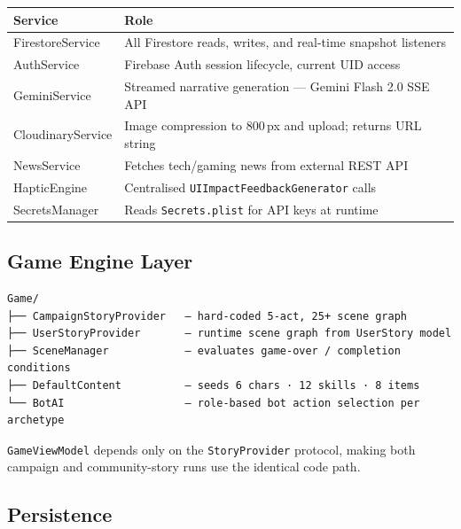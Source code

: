 \documentclass[12pt,a4paper]{article}
\begin{document}
\begin{center}
\begin{tabular}{>{\ttfamily\small}p{4cm} p{9.5cm}}
  \toprule
  \textbf{Service} & \textbf{Role} \\
  \midrule
  FirestoreService   & All Firestore reads, writes, and real-time snapshot listeners \\
  AuthService        & Firebase Auth session lifecycle, current UID access \\
  GeminiService      & Streamed narrative generation — Gemini Flash 2.0 SSE API \\
  CloudinaryService  & Image compression to 800\,px and upload; returns URL string \\
  NewsService        & Fetches tech/gaming news from external REST API \\
  HapticEngine       & Centralised \texttt{UIImpactFeedbackGenerator} calls \\
  SecretsManager     & Reads \texttt{Secrets.plist} for API keys at runtime \\
  \bottomrule
\end{tabular}
\end{center}

\subsection{Game Engine Layer}

{\small
\begin{verbatim}
Game/
├── CampaignStoryProvider   — hard-coded 5-act, 25+ scene graph
├── UserStoryProvider       — runtime scene graph from UserStory model
├── SceneManager            — evaluates game-over / completion conditions
├── DefaultContent          — seeds 6 chars · 12 skills · 8 items
└── BotAI                   — role-based bot action selection per archetype
\end{verbatim}
}

\texttt{GameViewModel} depends only on the \texttt{StoryProvider} protocol, making both campaign and community-story runs use the identical code path.

\subsection{Persistence}
\end{document}
